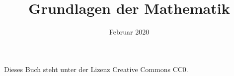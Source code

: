 \documentclass[a4paper,fleqn,11pt,dvipdfmx]{scrbook}
\title{Grundlagen der Mathematik}
\date{Februar 2020}
\theoremstyle{rmbox}
\numberwithin{Definition}{chapter}
\numberwithin{Satz}{chapter}
\begin{document}
\thispagestyle{empty}

\maketitle

\noindent
Dieses Buch steht unter der Lizenz Creative Commons CC0.

\tableofcontents











\printindex
\end{document}
